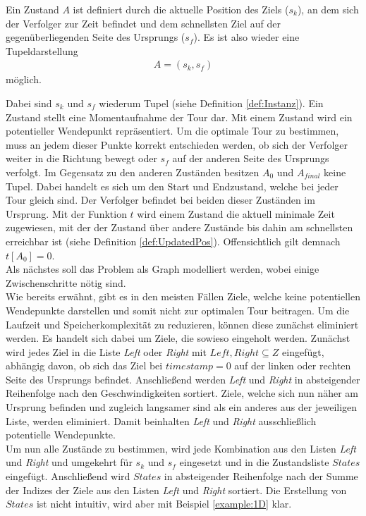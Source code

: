 \documentclass[german,version-2019-11]{uzl-thesis}
\begin{document}
\begin{definition}
Ein Zustand $A$ ist definiert durch die aktuelle Position des Ziels ($s_k$), an dem sich der Verfolger zur Zeit befindet und dem schnellsten Ziel auf der gegenüberliegenden Seite des Ursprungs ($s_f$). Es ist also wieder eine Tupeldarstellung
\begin{align*}
A = (s_k, s_f)
\end{align*}
möglich.
\end{definition}\noindent
Dabei sind $s_k$ und $s_f$ wiederum Tupel (siehe Definition \ref{def:Instanz}). Ein Zustand stellt eine Momentaufnahme der Tour dar. Mit einem Zustand wird ein potentieller Wendepunkt repräsentiert. Um die optimale Tour zu bestimmen, muss an jedem dieser Punkte korrekt entschieden werden, ob sich der Verfolger weiter in die Richtung bewegt oder $s_f$ auf der anderen Seite des Ursprungs verfolgt. Im Gegensatz zu den anderen Zuständen besitzen $A_0$ und $A_{final}$ keine Tupel. Dabei handelt es sich um den Start und Endzustand, welche bei jeder Tour gleich sind. Der Verfolger befindet bei beiden dieser Zuständen im Ursprung. 
Mit der Funktion $t$ wird einem Zustand die aktuell minimale Zeit zugewiesen, mit der der Zustand über andere Zustände bis dahin am schnellsten erreichbar ist (siehe Definition \ref{def:UpdatedPos}). Offensichtlich gilt demnach $t[A_0] = 0$. \\
Als nächstes soll das Problem als Graph modelliert werden, wobei einige Zwischenschritte nötig sind.\\
Wie bereits erwähnt, gibt es in den meisten Fällen Ziele, welche keine potentiellen Wendepunkte darstellen und somit nicht zur optimalen Tour beitragen. Um die Laufzeit und Speicherkomplexität zu reduzieren, können diese zunächst eliminiert werden. Es handelt sich dabei um Ziele, die sowieso eingeholt werden. Zunächst wird jedes Ziel in die Liste \emph{Left} oder \emph{Right} mit $Left, Right \subseteq Z$ eingefügt, abhängig davon, ob sich das Ziel bei $timestamp = 0$ auf der linken oder rechten Seite des Ursprungs befindet. Anschließend werden \emph{Left} und \emph{Right} in absteigender Reihenfolge nach den Geschwindigkeiten sortiert. Ziele, welche sich nun näher am Ursprung befinden
und zugleich langsamer sind als ein anderes aus der jeweiligen Liste, werden eliminiert. Damit beinhalten \emph{Left} und \emph{Right} ausschließlich potentielle Wendepunkte. \\
Um nun alle Zustände zu bestimmen, wird jede Kombination aus den Listen \emph{Left} und \emph{Right} und umgekehrt für $s_k$ und $s_f$ eingesetzt und in die Zustandsliste $States$ eingefügt. Anschließend wird $States$ in absteigender Reihenfolge nach der Summe der Indizes der Ziele aus den Listen \emph{Left} und \emph{Right} sortiert. Die Erstellung von $States$ ist nicht intuitiv, wird aber mit Beispiel \ref{example:1D} klar.
\end{document}

